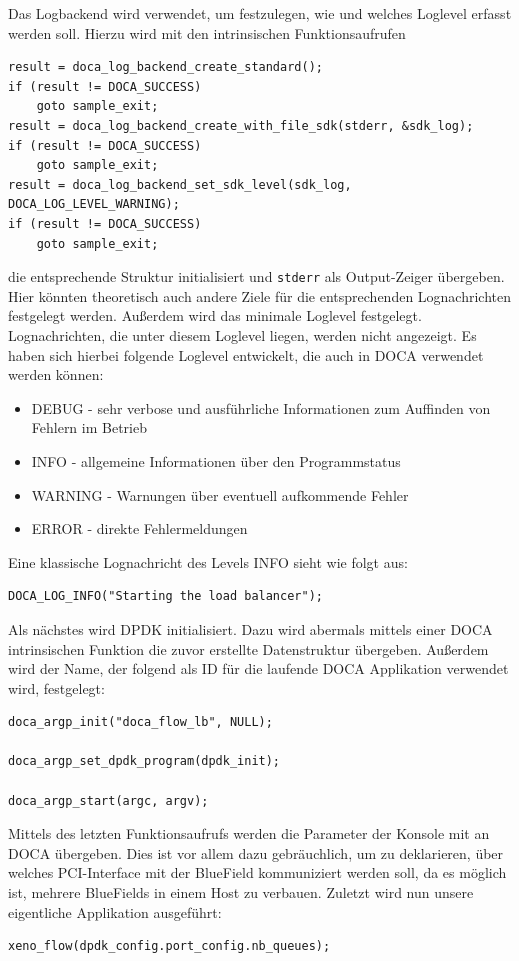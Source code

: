 Das Logbackend wird verwendet, um festzulegen, wie und welches Loglevel erfasst werden soll.
Hierzu wird mit den intrinsischen Funktionsaufrufen
\begin{verbatim}
result = doca_log_backend_create_standard();
if (result != DOCA_SUCCESS)
    goto sample_exit;
result = doca_log_backend_create_with_file_sdk(stderr, &sdk_log);
if (result != DOCA_SUCCESS)
    goto sample_exit;
result = doca_log_backend_set_sdk_level(sdk_log, DOCA_LOG_LEVEL_WARNING);
if (result != DOCA_SUCCESS)
    goto sample_exit;
\end{verbatim}
die entsprechende Struktur initialisiert und \texttt{stderr} als Output-Zeiger übergeben. Hier könnten theoretisch auch andere Ziele für die entsprechenden Lognachrichten festgelegt werden. Außerdem wird das minimale Loglevel festgelegt. Lognachrichten, die unter diesem Loglevel liegen, werden nicht angezeigt. Es haben sich hierbei folgende Loglevel entwickelt, die auch in DOCA verwendet werden können:
\begin{itemize}
    \item DEBUG - sehr verbose und ausführliche Informationen zum Auffinden von Fehlern im Betrieb
    \item INFO - allgemeine Informationen über den Programmstatus
    \item WARNING - Warnungen über eventuell aufkommende Fehler
    \item ERROR - direkte Fehlermeldungen
\end{itemize}
Eine klassische Lognachricht des Levels INFO sieht wie folgt aus:
\begin{verbatim}
DOCA_LOG_INFO("Starting the load balancer");
\end{verbatim}
Als nächstes wird DPDK initialisiert. Dazu wird abermals mittels einer DOCA intrinsischen Funktion die zuvor erstellte Datenstruktur übergeben. Außerdem wird der Name, der folgend als ID für die laufende DOCA Applikation verwendet wird, festgelegt:
\begin{verbatim}
doca_argp_init("doca_flow_lb", NULL);

doca_argp_set_dpdk_program(dpdk_init);

doca_argp_start(argc, argv);
\end{verbatim}
Mittels des letzten Funktionsaufrufs werden die Parameter der Konsole mit an DOCA übergeben. Dies ist vor allem dazu gebräuchlich, um zu deklarieren, über welches PCI-Interface mit der BlueField kommuniziert werden soll, da es möglich ist, mehrere BlueFields in einem Host zu verbauen.
Zuletzt wird nun unsere eigentliche Applikation ausgeführt:
\begin{verbatim}
xeno_flow(dpdk_config.port_config.nb_queues);
\end{verbatim}
